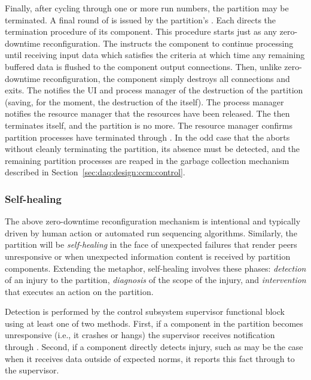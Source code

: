 Finally, after cycling through one or more run numbers, the partition may be terminated. 
A final round of  is issued by the partition's . 
Each  directs the termination procedure of its component. 
This procedure starts just as any zero-downtime reconfiguration. 
The  instructs the component to continue processing until receiving input data which satisfies the  criteria at which time any remaining buffered data is flushed to the component output connections. 
Then, unlike zero-downtime reconfiguration, the component simply destroys all connections and exits. 
The  notifies the UI and process manager of the destruction of the partition (saving, for the moment, the destruction of the  itself). 
The process manager notifies the resource manager that the resources have been released. 
The  then terminates itself, and the partition is no more.
The resource manager confirms partition processes have terminated through . 
In the odd case that the  aborts without cleanly terminating the partition, its absence must be detected, and the remaining partition processes are reaped in the garbage collection mechanism described in Section~\ref{sec:daq:design:ccm:control}.

\subsubsection{Self-healing}
\label{sec:daq:self-healing}

The above zero-downtime reconfiguration mechanism is intentional and typically driven by human action or automated run sequencing algorithms. 
Similarly, the partition will be \textit{self-healing} in the face of unexpected failures that render peers unresponsive or when unexpected information content is received by partition components.  
Extending the metaphor, self-healing involves these phases: \textit{detection} of an injury to the partition, \textit{diagnosis} of the scope of the injury, and \textit{intervention} that executes an action on the partition.

Detection is performed by the  control subsystem supervisor functional block using at least one of two methods.
First, if a component in the partition becomes unresponsive (i.e., it crashes or hangs) the supervisor  receives notification through  . 
Second, if a component directly detects injury, such as may be the case when it receives  data outside of expected norms, it reports this fact through  to the supervisor.

